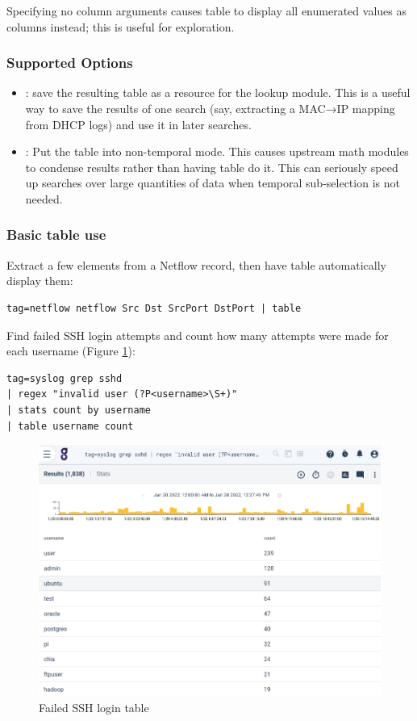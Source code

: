 Specifying no column arguments causes table to display all enumerated
values as columns instead; this is useful for exploration.

\subsubsection{Supported Options}

\begin{itemize}
\item
  : save the resulting table
  as a resource for the lookup module. This is a useful way to save the
  results of one search (say, extracting a MAC→IP mapping
  from DHCP logs) and use it in later searches.
\item
  : Put the table into non-temporal mode. This causes upstream math
  modules to condense results rather than having table do it. This can
  seriously speed up searches over large quantities of data when
  temporal sub-selection is not needed.
\end{itemize}

\subsubsection{Basic table use}

Extract a few elements from a Netflow record, then have table
automatically display them:

\begin{Verbatim}[breaklines=true]
tag=netflow netflow Src Dst SrcPort DstPort | table
\end{Verbatim}

Find failed SSH login attempts and count how many attempts were made for each username (Figure \ref{fig:table-ssh-bruteforce}):

\begin{Verbatim}[breaklines=true]
tag=syslog grep sshd 
| regex "invalid user (?P<username>\S+)" 
| stats count by username 
| table username count
\end{Verbatim}

\begin{figure}
	\includegraphics[width=0.7\linewidth]{images/table-ssh-bruteforce.png}
	\caption{Failed SSH login table}
	\label{fig:table-ssh-bruteforce}
\end{figure}

